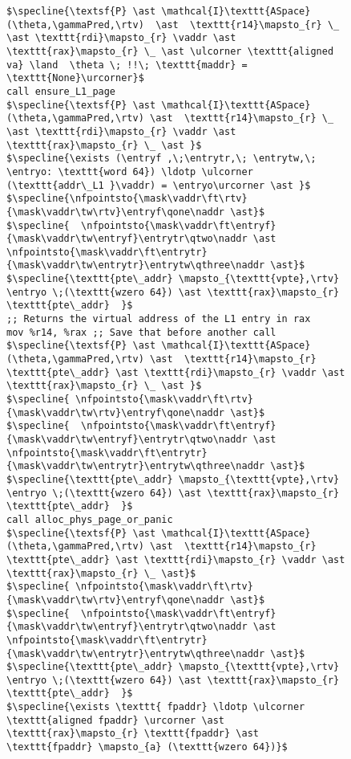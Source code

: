 \begin{figure}
  \begin{lstlisting}
$\specline{\textsf{P} \ast \mathcal{I}\texttt{ASpace}(\theta,\gammaPred,\rtv)  \ast  \texttt{r14}\mapsto_{r} \_ \ast \texttt{rdi}\mapsto_{r} \vaddr \ast \texttt{rax}\mapsto_{r} \_ \ast \ulcorner \texttt{aligned va} \land  \theta \; !!\; \texttt{maddr} = \texttt{None}\urcorner}$
call ensure_L1_page
$\specline{\textsf{P} \ast \mathcal{I}\texttt{ASpace}(\theta,\gammaPred,\rtv) \ast  \texttt{r14}\mapsto_{r} \_ \ast \texttt{rdi}\mapsto_{r} \vaddr \ast \texttt{rax}\mapsto_{r} \_ \ast }$
$\specline{\exists (\entryf ,\;\entrytr,\; \entrytw,\; \entryo: \texttt{word 64}) \ldotp \ulcorner (\texttt{addr\_L1 }\vaddr) = \entryo\urcorner \ast }$
$\specline{\nfpointsto{\mask\vaddr\ft\rtv}{\mask\vaddr\tw\rtv}\entryf\qone\naddr \ast}$ 
$\specline{  \nfpointsto{\mask\vaddr\ft\entryf}{\mask\vaddr\tw\entryf}\entrytr\qtwo\naddr \ast \nfpointsto{\mask\vaddr\ft\entrytr}{\mask\vaddr\tw\entrytr}\entrytw\qthree\naddr \ast}$
$\specline{\texttt{pte\_addr} \mapsto_{\texttt{vpte},\rtv} \entryo \;(\texttt{wzero 64}) \ast \texttt{rax}\mapsto_{r} \texttt{pte\_addr}  }$
;; Returns the virtual address of the L1 entry in rax
mov %r14, %rax ;; Save that before another call
$\specline{\textsf{P} \ast \mathcal{I}\texttt{ASpace}(\theta,\gammaPred,\rtv) \ast  \texttt{r14}\mapsto_{r} \texttt{pte\_addr} \ast \texttt{rdi}\mapsto_{r} \vaddr \ast \texttt{rax}\mapsto_{r} \_ \ast }$
$\specline{ \nfpointsto{\mask\vaddr\ft\rtv}{\mask\vaddr\tw\rtv}\entryf\qone\naddr \ast}$ 
$\specline{  \nfpointsto{\mask\vaddr\ft\entryf}{\mask\vaddr\tw\entryf}\entrytr\qtwo\naddr \ast \nfpointsto{\mask\vaddr\ft\entrytr}{\mask\vaddr\tw\entrytr}\entrytw\qthree\naddr \ast}$
$\specline{\texttt{pte\_addr} \mapsto_{\texttt{vpte},\rtv} \entryo \;(\texttt{wzero 64}) \ast \texttt{rax}\mapsto_{r} \texttt{pte\_addr}  }$
call alloc_phys_page_or_panic
$\specline{\textsf{P} \ast \mathcal{I}\texttt{ASpace}(\theta,\gammaPred,\rtv) \ast  \texttt{r14}\mapsto_{r} \texttt{pte\_addr} \ast \texttt{rdi}\mapsto_{r} \vaddr \ast \texttt{rax}\mapsto_{r} \_ \ast}$
$\specline{ \nfpointsto{\mask\vaddr\ft\rtv}{\mask\vaddr\tw\rtv}\entryf\qone\naddr \ast}$ 
$\specline{  \nfpointsto{\mask\vaddr\ft\entryf}{\mask\vaddr\tw\entryf}\entrytr\qtwo\naddr \ast \nfpointsto{\mask\vaddr\ft\entrytr}{\mask\vaddr\tw\entrytr}\entrytw\qthree\naddr \ast}$
$\specline{\texttt{pte\_addr} \mapsto_{\texttt{vpte},\rtv} \entryo \;(\texttt{wzero 64}) \ast \texttt{rax}\mapsto_{r} \texttt{pte\_addr}  }$
$\specline{\exists \texttt{ fpaddr} \ldotp \ulcorner \texttt{aligned fpaddr} \urcorner \ast \texttt{rax}\mapsto_{r} \texttt{fpaddr} \ast \texttt{fpaddr} \mapsto_{a} (\texttt{wzero 64})}$

\end{lstlisting}
\end{figure}

